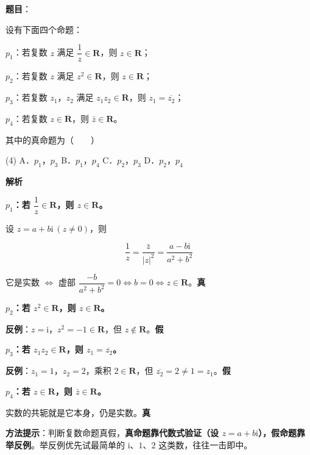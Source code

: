\begin{answer}

\textbf{题目}：

设有下面四个命题：

  $p_1$：若复数 $z$ 满足 $\dfrac1z\in\mathbf R$，则 $z\in\mathbf R$；

  $p_2$：若复数 $z$ 满足 $z^{2}\in\mathbf R$，则 $z\in\mathbf R$；

  $p_3$：若复数 $z_1$，$z_2$ 满足 $z_1z_2\in\mathbf R$，则 $z_1=\overline{z_2}$；

  $p_4$：若复数 $z\in\mathbf R$，则 $\bar z\in\mathbf R$。

其中的真命题为\mbox{（　　）}

\begin{gkopts}(4)
\task A．$p_1$，$p_3$
\task B．$p_1$，$p_4$
\task C．$p_2$，$p_3$
\task D．$p_2$，$p_4$
\end{gkopts}

\textbf{解析}

\textbf{$p_1$：若 $\dfrac1z\in\mathbf R$，则 $z\in\mathbf R$。}

设 $z=a+b\mathrm i\ (z\ne0)$，则

\nopagebreak[4]
\[\frac1z=\frac{\bar z}{|z|^{2}}=\frac{a-b\mathrm i}{a^{2}+b^{2}}\]

它是实数 $\iff$ 虚部 $\dfrac{-b}{a^{2}+b^{2}}=0\iff b=0\iff z\in\mathbf R$。\textbf{真} 

\textbf{$p_2$：若 $z^{2}\in\mathbf R$，则 $z\in\mathbf R$。}

\textbf{反例}：$z=\mathrm i$，$z^{2}=-1\in\mathbf R$，但 $z\notin\mathbf R$。\textbf{假} 

\textbf{$p_3$：若 $z_1z_2\in\mathbf R$，则 $z_1=\overline{z_2}$。}

\textbf{反例}：$z_1=1$，$z_2=2$，乘积 $2\in\mathbf R$，但 $\overline{z_2}=2\ne1=z_1$。\textbf{假} 

\textbf{$p_4$：若 $z\in\mathbf R$，则 $\bar z\in\mathbf R$。}

实数的共轭就是它本身，仍是实数。\textbf{真} 

\begin{gktip}
\textbf{方法提示}：判断复数命题真假，\textbf{真命题靠代数式验证（设 $z=a+b\mathrm i$），假命题靠举反例}。举反例优先试最简单的 $\mathrm i$、$1$、$2$ 这类数，往往一击即中。
\end{gktip}


\par\medskip

\end{answer}
